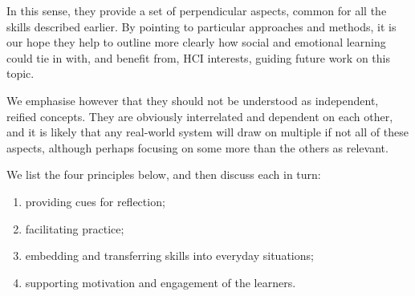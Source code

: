 \documentclass[prodmode,acmtochi]{acmsmall}
\begin{document}
In this sense, they provide a set of perpendicular aspects, common for all the skills described earlier. By pointing to particular approaches and methods, it is our hope they help to outline more clearly how social and emotional learning could tie in with, and benefit from, HCI interests, guiding future work on this topic. 

We emphasise however that they should not be understood as independent, reified concepts. They are obviously interrelated and dependent on each other, and it is likely that any real-world system will draw on multiple if not all of these aspects, although perhaps focusing on some more than the others as relevant.


We list the four principles below, and then discuss each in turn: 
\begin{enumerate}
        \item providing cues for reflection;
        \item facilitating practice;
        \item embedding and transferring skills into everyday situations;
        \item supporting motivation and engagement of the learners.
\end{enumerate}


\end{document}
